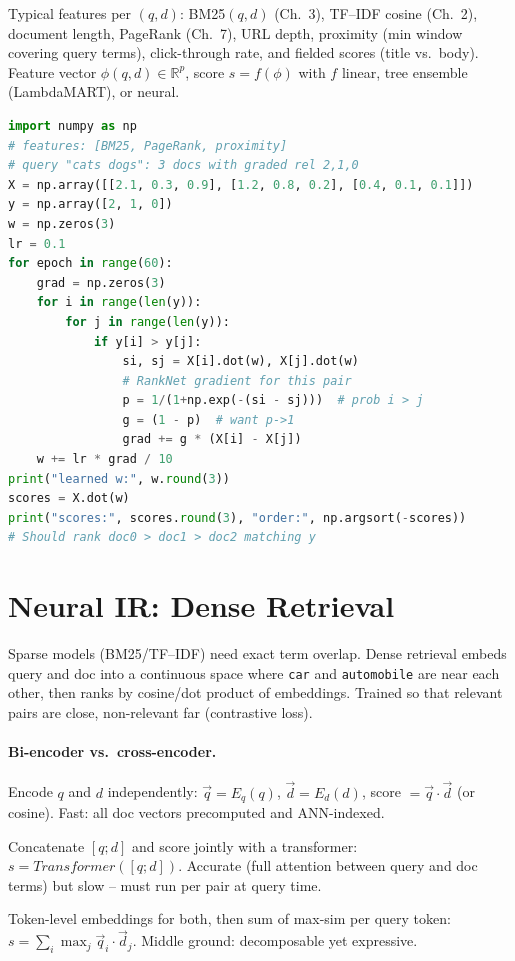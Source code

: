 \begin{definition}
Typical features per $(q,d)$: BM25$(q,d)$ (Ch.~3), TF--IDF cosine (Ch.~2), document length, PageRank (Ch.~7), URL depth, proximity (min window covering query terms), click-through rate, and fielded scores (title vs.\ body). Feature vector $\phi(q,d)\in\mathbb{R}^p$, score $s=f(\phi)$ with $f$ linear, tree ensemble (LambdaMART), or neural.
\end{definition}

\begin{lstlisting}[language=Python, caption={Toy pairwise ranker: learn linear weights with RankNet-style loss.}, label={lst:pairwise}]
import numpy as np
# features: [BM25, PageRank, proximity]
# query "cats dogs": 3 docs with graded rel 2,1,0
X = np.array([[2.1, 0.3, 0.9], [1.2, 0.8, 0.2], [0.4, 0.1, 0.1]])
y = np.array([2, 1, 0])
w = np.zeros(3)
lr = 0.1
for epoch in range(60):
    grad = np.zeros(3)
    for i in range(len(y)):
        for j in range(len(y)):
            if y[i] > y[j]:
                si, sj = X[i].dot(w), X[j].dot(w)
                # RankNet gradient for this pair
                p = 1/(1+np.exp(-(si - sj)))  # prob i > j
                g = (1 - p)  # want p->1
                grad += g * (X[i] - X[j])
    w += lr * grad / 10
print("learned w:", w.round(3))
scores = X.dot(w)
print("scores:", scores.round(3), "order:", np.argsort(-scores))
# Should rank doc0 > doc1 > doc2 matching y
\end{lstlisting}

\section{Neural IR: Dense Retrieval}\label{sec:dense}
Sparse models (BM25/TF--IDF) need exact term overlap. Dense retrieval embeds query and doc into a continuous space where \texttt{car} and \texttt{automobile} are near each other, then ranks by cosine/dot product of embeddings. Trained so that relevant pairs are close, non-relevant far (contrastive loss).

\paragraph{Bi-encoder vs.\ cross-encoder.}
\begin{description}[leftmargin=1.2em, itemsep=0.3em]
  \item[Bi-encoder] Encode $q$ and $d$ independently: $\vec{q}=E_q(q)$, $\vec{d}=E_d(d)$, score $=\vec{q}\cdot\vec{d}$ (or cosine). Fast: all doc vectors precomputed and ANN-indexed.
  \item[Cross-encoder] Concatenate $[q;d]$ and score jointly with a transformer: $s=Transformer([q;d])$. Accurate (full attention between query and doc terms) but slow -- must run per pair at query time.
  \item[ColBERT (late interaction)] Token-level embeddings for both, then sum of max-sim per query token: $s=\sum_{i}\max_j \vec{q}_i\cdot\vec{d}_j$. Middle ground: decomposable yet expressive.
\end{description}

